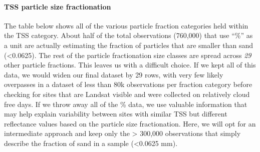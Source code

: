 \documentclass[]{article}
\newenvironment{Shaded}{\begin{snugshade}}{\end{snugshade}}
\newcommand{\CommentTok}[1]{\textcolor[rgb]{0.56,0.35,0.01}{\textit{#1}}}
\newcommand{\DataTypeTok}[1]{\textcolor[rgb]{0.13,0.29,0.53}{#1}}
\newcommand{\KeywordTok}[1]{\textcolor[rgb]{0.13,0.29,0.53}{\textbf{#1}}}
\newcommand{\NormalTok}[1]{#1}
\newcommand{\OperatorTok}[1]{\textcolor[rgb]{0.81,0.36,0.00}{\textbf{#1}}}
\newcommand{\StringTok}[1]{\textcolor[rgb]{0.31,0.60,0.02}{#1}}
\let\oldparagraph\paragraph
\renewcommand{\paragraph}[1]{\oldparagraph{#1}\mbox{}}
\begin{document}
\hypertarget{tss-particle-size-fractionation}{%
\paragraph{TSS particle size
fractionation}\label{tss-particle-size-fractionation}}

The table below shows all of the various particle fraction categories
held within the TSS category. About half of the total observations
(760,000) that use ``\%'' as a unit are actually estimating the fraction
of particles that are smaller than sand (\textless{}0.0625). The rest of
the particle fractionation size classes are spread across \emph{29}
other particle fractions. This leaves us with a difficult choice. If we
kept all of this data, we would widen our final dataset by 29 rows, with
very few likely overpasses in a dataset of less than 80k observations
per fraction category before checking for sites that are Landsat visible
and were collected on relatively cloud free days. If we throw away all
of the \% data, we use valuable information that may help explain
variability between sites with similar TSS but different reflectance
values based on the particle size fractionation. Here, we will opt for
an intermediate approach and keep only the \textgreater{} 300,000
observations that simply describe the fraction of sand in a sample
(\textless{}0.0625 mm).

\begin{Shaded}
\end{Shaded}
\end{document}
